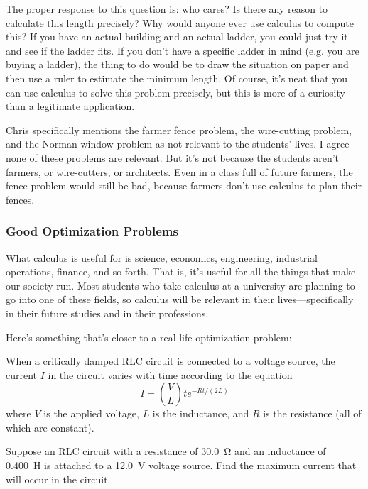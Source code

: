 The proper response to this question is: who cares? Is there any reason to calculate this length precisely? Why would anyone ever use calculus to compute this? If you have an actual building and an actual ladder, you could just try it and see if the ladder fits. If you don't have a specific ladder in mind (e.g. you are buying a ladder), the thing to do would be to draw the situation on paper and then use a ruler to estimate the minimum length. Of course, it's neat that you can use calculus to solve this problem precisely, but this is more of a curiosity than a legitimate application.

Chris specifically mentions the farmer fence problem, the wire-cutting problem, and the Norman window problem as not relevant to the students' lives. I agree—none of these problems are relevant. But it's not because the students aren't farmers, or wire-cutters, or architects. Even in a class full of future farmers, the fence problem would still be bad, because farmers don't use calculus to plan their fences.

\subsubsection*{Good Optimization Problems}
What calculus is useful for is science, economics, engineering, industrial operations, finance, and so forth. That is, it's useful for all the things that make our society run. Most students who take calculus at a university are planning to go into one of these fields, so calculus will be relevant in their lives—specifically in their future studies and in their professions.

Here's something that's closer to a real-life optimization problem:

\begin{adjustwidth}{1cm}{}
  When a critically damped RLC circuit is connected to a voltage source, the current $ I $ in the circuit varies with time according to the equation
  \begin{displaymath}
    I = \left(\frac{V}{L}\right)te^{-Rt/(2L)}
  \end{displaymath}
  where $V$ is the applied voltage, $L$ is the inductance, and $R$ is the resistance (all of which are constant).

  Suppose an RLC circuit with a resistance of \SI{30.0}{\ohm} and an inductance of \SI{0.400}{\henry} is attached to a \SI{12.0}{\volt} voltage source. Find the maximum current that will occur in the circuit.
\end{adjustwidth}

